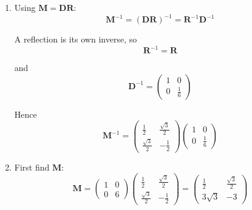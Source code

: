 \documentclass[leqno]{article}
\begin{document}
\begin{enumerate}[
  label=\textbf{\arabic*.},
  leftmargin=*,
  topsep=0pt,
  partopsep=0pt,
  parsep=0pt
]
\begin{djsSolution}
\begin{enumerate}[label=\textbf{(\alph*)}]
Comparing with \(\mathbf{R}\):
\[
\cos 2\theta=\frac12,
\qquad
\sin 2\theta=\frac{\sqrt3}{2}
\]

so
\[
2\theta=60^\circ
\quad\Longrightarrow\quad
\theta=30^\circ
\]

Therefore \(\mathbf{R}\) is a reflection in the line through the origin at \(30^\circ\) to the \(x\)-axis, whose equation is
\[
y=(\tan 30^\circ)x=\frac{x}{\sqrt3}
\]

Now consider \(\mathbf{D}\). It maps
\[
\begin{pmatrix}x\\y\end{pmatrix}
\mapsto
\begin{pmatrix}x\\6y\end{pmatrix}
\]

so it is a stretch parallel to the \(y\)-axis with scale factor \(6\), with the \(x\)-axis invariant.

Since \(\mathbf{M}=\mathbf{D}\mathbf{R}\), the matrix on the right acts first.

So the transformations are
\[
\text{first reflect in } y=\frac{x}{\sqrt3},
\quad
\text{then stretch parallel to the } y\text{-axis with scale factor }6
\]

\item Using \(\mathbf{M}=\mathbf{D}\mathbf{R}\):
\[
\mathbf{M}^{-1}=(\mathbf{D}\mathbf{R})^{-1}=\mathbf{R}^{-1}\mathbf{D}^{-1}
\]

A reflection is its own inverse, so
\[
\mathbf{R}^{-1}=\mathbf{R}
\]

and
\[
\mathbf{D}^{-1}=\begin{pmatrix}1&0\\0&\frac16\end{pmatrix}
\]

Hence
\[
\mathbf{M}^{-1}
=
\begin{pmatrix}
\frac12&\frac{\sqrt3}{2}\\[4pt]
\frac{\sqrt3}{2}&-\frac12
\end{pmatrix}
\begin{pmatrix}
1&0\\[4pt]
0&\frac16
\end{pmatrix}
\]

\item First find \(\mathbf{M}\):
\[
\mathbf{M}=
\begin{pmatrix}1&0\\0&6\end{pmatrix}
\begin{pmatrix}\frac12&\frac{\sqrt3}{2}\\[4pt]\frac{\sqrt3}{2}&-\frac12\end{pmatrix}
=
\begin{pmatrix}
\frac12&\frac{\sqrt3}{2}\\[4pt]
3\sqrt3&-3
\end{pmatrix}
\]


\end{enumerate}
\end{djsSolution}
\end{enumerate}
\end{document}

